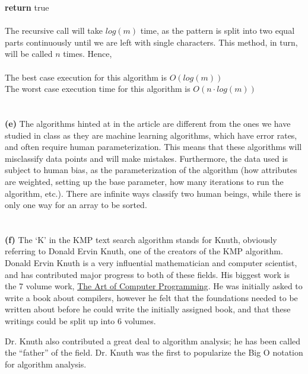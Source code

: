 \documentclass{article}
\begin{document}
	\indent \textbf{return} true \\
	\\
	The recursive call will take $log(m)$ time, as the pattern is split into two equal parts continuously until we are left with single characters. This method, in turn, will be called $n$ times. Hence,\\
	\\
	The best case execution for this algorithm is $\boxed{O(log(m))}$ \\
	The worst case execution time for this algorithm is $\boxed{O(n \cdot log(m))}$ \\
	\\
	\\
	\textbf{(e)} The algorithms hinted at in the article are different from the ones we have studied in class as they are machine learning algorithms, which have error rates, and often require human parameterization. This means that these algorithms will misclassify data points and will make mistakes. Furthermore, the data used is subject to human bias, as the parameterization of the algorithm (how attributes are weighted, setting up the base parameter, how many iterations to run the algorithm, etc.). There are infinite ways classify two human beings, while there is only one way for an array to be sorted.\\
	\\
	\\
	\textbf{(f)} The `K' in the KMP text search algorithm stands for Knuth, obviously referring to Donald Ervin Knuth, one of the creators of the KMP algorithm. Donald Ervin Knuth is a very influential mathematician and computer scientist, and has contributed major progress to both of these fields. His biggest work is the 7 volume work, \underline{The Art of Computer Programming}. He was initially asked to write a book about compilers, however he felt that the foundations needed to be written about before he could write the initially assigned book, and that these writings could be split up into 6 volumes. 
	
	Dr. Knuth also contributed a great deal to algorithm analysis; he has been called the ``father'' of the field. Dr. Knuth was the first to popularize the Big O notation for algorithm analysis.
	
\end{document}

